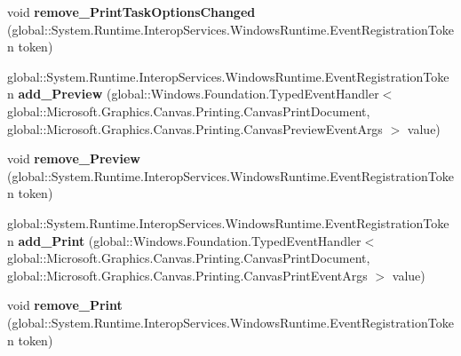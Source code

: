\begin{DoxyCompactItemize}
\item 
\mbox{\label{class_microsoft_1_1_graphics_1_1_canvas_1_1_printing_1_1_canvas_print_document_a0de28697a340eecb4f4b11addd897850}} 
void {\bfseries remove\+\_\+\+Print\+Task\+Options\+Changed} (global\+::\+System.\+Runtime.\+Interop\+Services.\+Windows\+Runtime.\+Event\+Registration\+Token token)
\item 
\mbox{\label{class_microsoft_1_1_graphics_1_1_canvas_1_1_printing_1_1_canvas_print_document_a27f47fca50c0e59ac08d765c11296386}} 
global\+::\+System.\+Runtime.\+Interop\+Services.\+Windows\+Runtime.\+Event\+Registration\+Token {\bfseries add\+\_\+\+Preview} (global\+::\+Windows.\+Foundation.\+Typed\+Event\+Handler$<$ global\+::\+Microsoft.\+Graphics.\+Canvas.\+Printing.\+Canvas\+Print\+Document, global\+::\+Microsoft.\+Graphics.\+Canvas.\+Printing.\+Canvas\+Preview\+Event\+Args $>$ value)
\item 
\mbox{\label{class_microsoft_1_1_graphics_1_1_canvas_1_1_printing_1_1_canvas_print_document_aa7beedc13a3a13307163655bbab18019}} 
void {\bfseries remove\+\_\+\+Preview} (global\+::\+System.\+Runtime.\+Interop\+Services.\+Windows\+Runtime.\+Event\+Registration\+Token token)
\item 
\mbox{\label{class_microsoft_1_1_graphics_1_1_canvas_1_1_printing_1_1_canvas_print_document_a9da3eaf71e29837bb52c49b799a88293}} 
global\+::\+System.\+Runtime.\+Interop\+Services.\+Windows\+Runtime.\+Event\+Registration\+Token {\bfseries add\+\_\+\+Print} (global\+::\+Windows.\+Foundation.\+Typed\+Event\+Handler$<$ global\+::\+Microsoft.\+Graphics.\+Canvas.\+Printing.\+Canvas\+Print\+Document, global\+::\+Microsoft.\+Graphics.\+Canvas.\+Printing.\+Canvas\+Print\+Event\+Args $>$ value)
\item 
\mbox{\label{class_microsoft_1_1_graphics_1_1_canvas_1_1_printing_1_1_canvas_print_document_a247a72beac098c3ac4e60deec5108fb3}} 
void {\bfseries remove\+\_\+\+Print} (global\+::\+System.\+Runtime.\+Interop\+Services.\+Windows\+Runtime.\+Event\+Registration\+Token token)

\end{DoxyCompactItemize}
